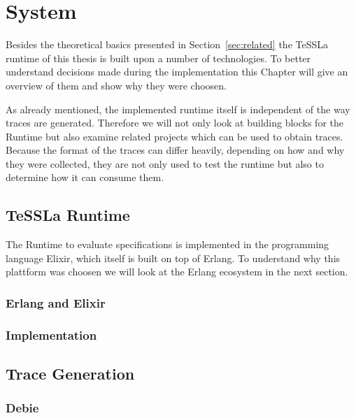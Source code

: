 %
\chapter{System}
\label{sec:system}

Besides the theoretical basics presented in Section~\ref{sec:related} the TeSSLa runtime of this thesis is built upon a number of technologies.
To better understand decisions made during the implementation this Chapter will give an overview of them and show why they were choosen.

As already mentioned, the implemented runtime itself is independent of the way traces are generated.
Therefore we will not only look at building blocks for the Runtime but also examine related projects which can be used to obtain traces.
Because the format of the traces can differ heavily, depending on how and why they were collected, they are not only used to test the runtime but also to determine how it can consume them.

\section{TeSSLa Runtime}
\label{sec:system:runtime}

The Runtime to evaluate specifications is implemented in the programming language Elixir, which itself is built on top of Erlang.
To understand why this plattform was choosen we will look at the Erlang ecosystem in the next section.

\subsection{Erlang and Elixir}
\label{sec:system:eval_engine:erlang_elixir}
\subsection{Implementation}

\section{Trace Generation}
\label{sec:system:traces}

\subsection{Debie}
